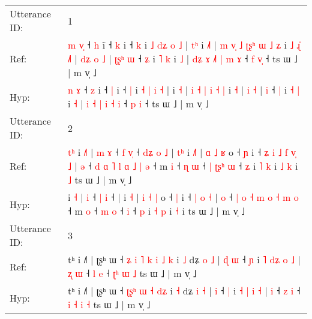 \documentclass[10pt]{article}
\DeclareRobustCommand{\hl}[1]{{\textcolor{red}{#1}}}
\begin{document}
\begin{longtable}{ll}
\toprule
Utterance ID: & 1 \\
Ref: & \hl{m} \hl{v}\hl{̩} ˧ \hl{h} i\hl{̃} ˧ \hl{k} i ˧ \hl{k} i \hl{˩} \hl{d}\hl{ʑ} \hl{o} \hl{˩} |\hl{ }\hl{t}\hl{ʰ} i \hl{˩}\hl{˥} |\hl{ }\hl{m} \hl{v}\hl{̩} \hl{˩} \hl{ʈ}\hl{ʂ}\hl{ʰ} \hl{ɯ} \hl{˩} \hl{ʑ} i\hl{ }\hl{˩}\hl{ }\hl{ɻ}\hl{̍} \hl{˩}\hl{˥} |\hl{ }\hl{d}\hl{ʑ} \hl{o} \hl{˩} |\hl{ }\hl{ʈ}\hl{ʂ}\hl{ʰ} \hl{ɯ} ˧ \hl{ʑ} i \hl{˥} \hl{k} i \hl{˩} | \hl{d}\hl{ʑ} \hl{ɤ} \hl{˩}\hl{˥} \hl{|} \hl{m} \hl{ɤ} ˧ \hl{f} \hl{v}\hl{̩} ˧ ts ɯ ˩ | m v̩ ˩
 \\
Hyp: & \hl{n} \hl{}\hl{ɤ} ˧ \hl{z} i\hl{} ˧ \hl{|} i ˧ \hl{|} i \hl{˧} \hl{}\hl{|} \hl{i} \hl{˧} |\hl{}\hl{}\hl{} i \hl{}\hl{˧} |\hl{}\hl{} \hl{}\hl{i} \hl{˧} \hl{}\hl{}\hl{|} \hl{i} \hl{˧} \hl{|} i\hl{}\hl{}\hl{}\hl{}\hl{} \hl{}\hl{˧} |\hl{}\hl{}\hl{} \hl{i} \hl{˧} |\hl{}\hl{}\hl{}\hl{} \hl{i} ˧ \hl{|} i \hl{˧} \hl{|} i \hl{˧} | \hl{}\hl{i} \hl{˧} \hl{}\hl{|} \hl{i} \hl{˧} \hl{i} ˧ \hl{p} \hl{}\hl{i} ˧ ts ɯ ˩ | m v̩ ˩
 \\
\midrule
Utterance ID: & 2 \\
Ref: & \hl{t}\hl{ʰ}\hl{ }i \hl{˩}\hl{˥} |\hl{ }\hl{m} \hl{ɤ} ˧ \hl{f} \hl{v}\hl{̩} ˧\hl{ }\hl{d}\hl{ʑ}\hl{ }\hl{o}\hl{ }\hl{˩} |\hl{ }\hl{t}\hl{ʰ} i \hl{˩}\hl{˥} | \hl{ɑ} \hl{˩} \hl{ʁ} o ˧ \hl{ɲ} i ˧\hl{ }\hl{ʑ}\hl{ }\hl{i}\hl{ }\hl{˩} \hl{f} \hl{v}\hl{̩} \hl{˩} | \hl{ə} ˧ \hl{d} \hl{ɑ} \hl{˥} \hl{l} \hl{ɑ} \hl{˩} \hl{|} \hl{ə} ˧ m \hl{i} ˧ \hl{ɳ} \hl{ɯ} ˧\hl{ }\hl{|}\hl{ }\hl{ʈ}\hl{ʂ}\hl{ʰ} \hl{ɯ} ˧ \hl{ʑ} i \hl{˥} \hl{k} i\hl{ }\hl{˩} \hl{k} i\hl{ }\hl{˩} ts ɯ ˩ | m v̩ ˩
 \\
Hyp: & \hl{}\hl{}\hl{}i \hl{}\hl{˧} |\hl{}\hl{} \hl{i} ˧ \hl{|} \hl{}\hl{i} ˧\hl{}\hl{}\hl{}\hl{}\hl{}\hl{}\hl{} |\hl{}\hl{}\hl{} i \hl{}\hl{˧} | \hl{i} \hl{˧} \hl{|} o ˧ \hl{|} i ˧\hl{}\hl{}\hl{}\hl{}\hl{}\hl{} \hl{|} \hl{}\hl{o} \hl{˧} | \hl{o} ˧ \hl{|} \hl{o} \hl{˧} \hl{m} \hl{o} \hl{˧} \hl{m} \hl{o} ˧ m \hl{o} ˧ \hl{m} \hl{o} ˧\hl{}\hl{}\hl{}\hl{}\hl{}\hl{} \hl{i} ˧ \hl{p} i \hl{˧} \hl{p} i\hl{}\hl{} \hl{˧} i\hl{}\hl{} ts ɯ ˩ | m v̩ ˩
 \\
\midrule
Utterance ID: & 3 \\
Ref: & tʰ i ˩˥ | ʈʂʰ ɯ ˧\hl{ }\hl{ʑ} \hl{i}\hl{ }\hl{˥} \hl{k} \hl{i} \hl{˩}\hl{ }\hl{k} i \hl{˩} dʑ \hl{o} \hl{˩} |\hl{ }\hl{ɖ} \hl{ɯ} ˧ \hl{ɲ} i \hl{˥} \hl{d}\hl{ʑ} \hl{o} \hl{˩} |\hl{ }\hl{ʐ} \hl{ɯ} ˧ \hl{l} \hl{e} ˧ \hl{}\hl{ʈ}\hl{ʰ} \hl{ɯ} \hl{˩} ts ɯ ˩ | m v̩ ˩
 \\
Hyp: & tʰ i ˩˥ | ʈʂʰ ɯ ˧\hl{}\hl{} \hl{ʈ}\hl{ʂ}\hl{ʰ} \hl{ɯ} \hl{˧} \hl{}\hl{d}\hl{ʑ} i \hl{˧} dʑ \hl{i} \hl{˧} |\hl{}\hl{} \hl{i} ˧ \hl{|} i \hl{˧} \hl{}\hl{|} \hl{i} \hl{˧} |\hl{}\hl{} \hl{i} ˧ \hl{z} \hl{i} ˧ \hl{i}\hl{ }\hl{˧} \hl{i} \hl{˧} ts ɯ ˩ | m v̩ ˩

\end{longtable}
\end{document}
